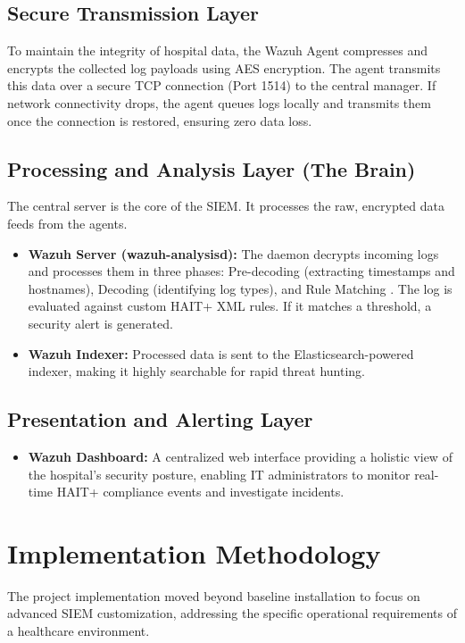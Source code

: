 \subsection{Secure Transmission Layer}
To maintain the integrity of hospital data, the Wazuh Agent compresses and encrypts the collected log payloads using AES encryption. The agent transmits this data over a secure TCP connection (Port 1514) to the central manager. If network connectivity drops, the agent queues logs locally and transmits them once the connection is restored, ensuring zero data loss.

\subsection{Processing and Analysis Layer (The Brain)}
The central server is the core of the SIEM. It processes the raw, encrypted data feeds from the agents.
\begin{itemize}
\item \textbf{Wazuh Server (wazuh-analysisd):} The daemon decrypts incoming
logs and processes them in three phases: Pre-decoding (extracting timestamps
and hostnames), Decoding (identifying log types), and Rule Matching
\cite{wazuh_architecture}. The log is evaluated against custom HAIT+ XML
rules. If it matches a threshold, a security alert is generated.
\item \textbf{Wazuh Indexer:} Processed data is sent to the Elasticsearch-powered indexer, making it highly searchable for rapid threat hunting.
\end{itemize}

\subsection{Presentation and Alerting Layer}
\begin{itemize}
\item \textbf{Wazuh Dashboard:} A centralized web interface providing a holistic view of the hospital's security posture, enabling IT administrators to monitor real-time HAIT+ compliance events and investigate incidents.
\end{itemize}

\section{Implementation Methodology}
\label{sec:dev-methodology}
The project implementation moved beyond baseline installation to focus on advanced SIEM customization, addressing the specific operational requirements of a healthcare environment.

